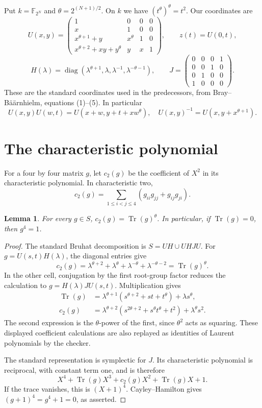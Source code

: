 \documentclass[11pt,a4paper]{article}
\newtheorem{lemma}[theorem]{Lemma}
\newcommand{\Tr}{\operatorname{Tr}}
\newcommand{\F}{\mathbb F}
\begin{document}
Put $k=\F_{2^N}$ and $\theta=2^{(N+1)/2}$. On $k$ we have
$(t^\theta)^\theta=t^2$. Our coordinates are
\[
 U(x,y)=\begin{pmatrix}
 1&0&0&0\\x&1&0&0\\x^{\theta+1}+y&x^\theta&1&0\\
 x^{\theta+2}+xy+y^\theta&y&x&1
 \end{pmatrix},\qquad z(t)=U(0,t),
\]
\[
 H(\lambda)=\operatorname{diag}(\lambda^{\theta+1},\lambda,
 \lambda^{-1},\lambda^{-\theta-1}),\qquad
 J=\begin{pmatrix}0&0&0&1\\0&0&1&0\\0&1&0&0\\1&0&0&0\end{pmatrix}.
\]
These are the standard coordinates used in the predecessors, from
Bray--B\"a\"arnhielm, equations (1)--(5). In particular
\[
 U(x,y)U(w,t)=U(x+w,y+t+xw^\theta),
 \quad U(x,y)^{-1}=U(x,y+x^{\theta+1}).                 \tag{1}
\]

\section*{The characteristic polynomial}

For a four by four matrix $g$, let $c_2(g)$ be the coefficient of
$X^2$ in its characteristic polynomial. In characteristic two,
\[
 c_2(g)=\sum_{1\le i<j\le4}(g_{ii}g_{jj}+g_{ij}g_{ji}). \tag{2}
\]

\begin{lemma}\label{characteristic}
For every $g\in S$, $c_2(g)=\Tr(g)^\theta$. In particular,
if $\Tr(g)=0$, then $g^4=1$.
\end{lemma}
\begin{proof}
The standard Bruhat decomposition is $S=UH\cup UHJ U$.
For $g=U(s,t)H(\lambda)$, the diagonal entries give
\[
 c_2(g)=\lambda^{\theta+2}+\lambda^\theta+
 \lambda^{-\theta}+\lambda^{-\theta-2}=\Tr(g)^\theta.
\]
In the other cell, conjugation by the first root-group factor reduces
the calculation to $g=H(\lambda)JU(s,t)$. Multiplication gives
\begin{align*}
 \Tr(g)&=\lambda^{\theta+1}(s^{\theta+2}+st+t^\theta)
                 +\lambda s^\theta,\\
 c_2(g)&=\lambda^{\theta+2}
       (s^{2\theta+2}+s^\theta t^\theta+t^2)
                 +\lambda^\theta s^2.
\end{align*}
The second expression is the $\theta$-power of the first, since
$\theta^2$ acts as squaring. These displayed coefficient calculations
are also replayed as identities of Laurent polynomials by the checker.

The standard representation is symplectic for $J$. Its characteristic
polynomial is reciprocal, with constant term one, and is therefore
\[
 X^4+\Tr(g)X^3+c_2(g)X^2+\Tr(g)X+1.
\]
If the trace vanishes, this is $(X+1)^4$. Cayley--Hamilton gives
$(g+1)^4=g^4+1=0$, as asserted.
\end{proof}
\end{document}
